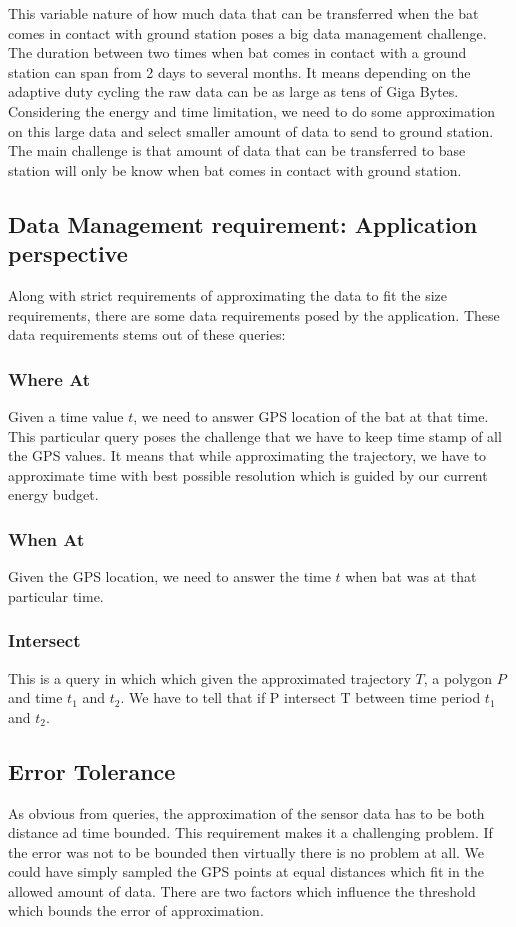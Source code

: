 \documentclass[conference]{IEEEtran}
\begin{document}
This variable nature of how much data that can be transferred when the bat comes in contact with 
ground station poses a big data management challenge. The duration between two times when bat 
comes in contact with a ground station can span from 2 days to several months\cite{raja-ipsn}. 
It means depending on the adaptive duty cycling the raw data can be as large as tens of Giga 
Bytes. Considering the energy and time limitation, we need to do some approximation on this large 
data and select smaller amount of data to send to ground station. The main challenge is that amount 
of data that can be transferred to base station will only be know when bat comes in contact with 
ground station.\

\subsection{Data Management requirement: Application perspective}
Along with strict requirements of approximating the data to fit the size requirements, there are 
some data requirements posed by the application. These data requirements stems out of these queries:
\subsubsection{Where At}
Given a time value $t$, we need to answer GPS location of the bat at that time. This particular 
query poses the challenge that we have to keep time stamp of all the GPS values. It means that while 
approximating the trajectory, we have to approximate time with best possible resolution which is guided 
by our current energy budget.
\subsubsection{When At}
Given the GPS location, we need to answer the time $t$ when bat was at that particular time. 
\subsubsection{Intersect}
This is a query in which which given the approximated trajectory $T$, a polygon $P$ and time $t_1$ and 
$t_2$. We have to tell that if P intersect T between time period $t_1$ and $t_2$.
\subsection{Error Tolerance}
As obvious from queries, the approximation of the sensor data has to be both distance ad time bounded. 
This requirement makes it a challenging problem. If the error was not to be bounded then virtually 
there is no problem at all. We could have simply sampled the GPS points at equal distances which fit 
in the allowed amount of data. There are two factors which influence the threshold which bounds the error 
of approximation.\
\end{document}
